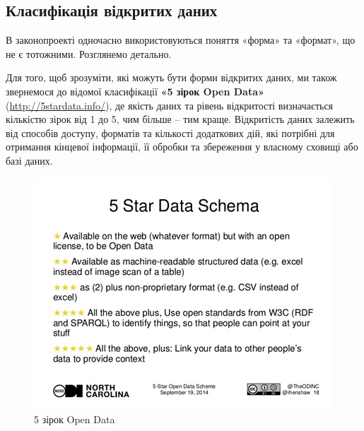 \subsection{Класифікація відкритих даних}

В законопроекті одночасно використовуються поняття «форма» та «формат», що не є тотожними. Розглянемо детально.

Для того, щоб зрозуміти, які можуть бути форми відкритих даних, ми також звернемося до відомої класифікації \textbf{«5 зірок Open Data»} (\url{http://5stardata.info/}), де якість даних та рівень відкритості визначається кількістю зірок від 1 до 5, чим більше – тим краще. Відкритість даних залежить від способів доступу, форматів та кількості додаткових дій, які потрібні для отримання кінцевої інформації, її обробки та збереження у власному сховищі або базі даних.

\begin{figure}[h]
    \centering
    \includegraphics[width=\textwidth]{images/001.gif}
    \caption{5 зірок Open Data}
\end{figure}

